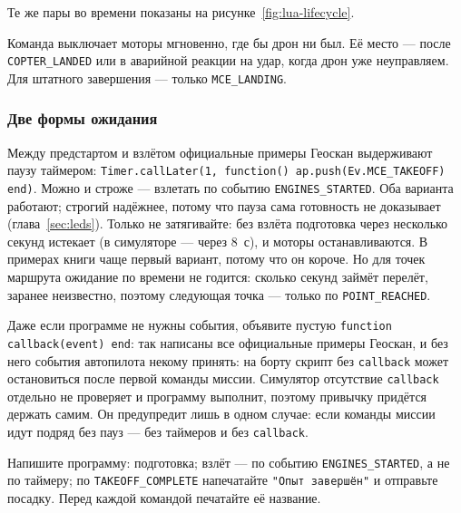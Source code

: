 Те же пары во времени показаны на рисунке~\ref{fig:lua-lifecycle}.



\begin{warnbox}
Команда выключает моторы мгновенно, где бы дрон ни был. Её место --- после \verb|COPTER_LANDED| или в аварийной реакции на удар, когда дрон уже неуправляем. Для штатного завершения --- только \verb|MCE_LANDING|.
\end{warnbox}

\subsubsection*{Две формы ожидания}

Между предстартом и взлётом официальные примеры Геоскан выдерживают паузу таймером: \texttt{Timer.callLater(1, function() ap.push(Ev.MCE\_TAKEOFF) end)}. Можно и строже --- взлетать по событию \verb|ENGINES_STARTED|. Оба варианта работают; строгий надёжнее, потому что пауза сама готовность не доказывает (глава~\ref{sec:leds}). Только не затягивайте: без взлёта подготовка через несколько секунд истекает (в симуляторе --- через 8~с), и моторы останавливаются. В примерах книги чаще первый вариант, потому что он короче. Но для точек маршрута ожидание по времени не годится: сколько секунд займёт перелёт, заранее неизвестно, поэтому следующая точка --- только по \verb|POINT_REACHED|.

\begin{rulebox}
Даже если программе не нужны события, объявите пустую \verb|function callback(event) end|: так написаны все официальные примеры Геоскан, и без него события автопилота некому принять: на борту скрипт без \verb|callback| может остановиться после первой команды миссии. Симулятор отсутствие \verb|callback| отдельно не проверяет и программу выполнит, поэтому привычку придётся держать самим. Он предупредит лишь в одном случае: если команды миссии идут подряд без пауз --- без таймеров и без \verb|callback|.
\end{rulebox}

\begin{taskbox}
Напишите программу: подготовка; взлёт --- по событию \verb|ENGINES_STARTED|, а не по таймеру; по \verb|TAKEOFF_COMPLETE| напечатайте \verb|"Опыт завершён"| и отправьте посадку. Перед каждой командой печатайте её название.
\end{taskbox}
